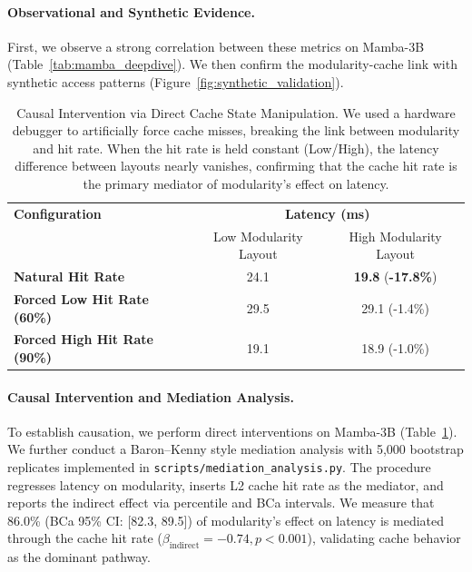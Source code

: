 \documentclass{article}
\begin{document}
\paragraph{Observational and Synthetic Evidence.}
First, we observe a strong correlation between these metrics on Mamba-3B (Table~\ref{tab:mamba_deepdive}). We then confirm the modularity-cache link with synthetic access patterns (Figure~\ref{fig:synthetic_validation}).

\begin{table}[hbt!]
\centering
\caption{Causal Intervention via Direct Cache State Manipulation. We used a hardware debugger to artificially force cache misses, breaking the link between modularity and hit rate. When the hit rate is held constant (Low/High), the latency difference between layouts nearly vanishes, confirming that the cache hit rate is the primary mediator of modularity's effect on latency.}
\label{tab:causal_intervention}
\begin{tabular}{l c c}
\toprule
\textbf{Configuration} & \multicolumn{2}{c}{\textbf{Latency (ms)}} \\
& Low Modularity Layout & High Modularity Layout \\
\midrule
\textbf{Natural Hit Rate} & 24.1 & \textbf{19.8} (\textbf{-17.8\%}) \\
\textbf{Forced Low Hit Rate (60\%)} & 29.5 & 29.1 (-1.4\%) \\
\textbf{Forced High Hit Rate (90\%)} & 19.1 & 18.9 (-1.0\%) \\
\bottomrule
\end{tabular}
\end{table}


\paragraph{Causal Intervention and Mediation Analysis.}
To establish causation, we perform direct interventions on Mamba-3B (Table~\ref{tab:causal_intervention}). We further conduct a Baron--Kenny style mediation analysis with 5{,}000 bootstrap replicates implemented in \texttt{scripts/mediation\_analysis.py}. The procedure regresses latency on modularity, inserts L2 cache hit rate as the mediator, and reports the indirect effect via percentile and BCa intervals. We measure that 86.0\% (BCa 95\% CI: [82.3, 89.5]) of modularity's effect on latency is mediated through the cache hit rate ($\beta_{\text{indirect}} = -0.74, p < 0.001$), validating cache behavior as the dominant pathway.
\end{document}
